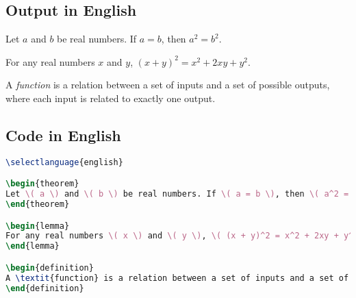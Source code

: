 \documentclass[swedish]{article}
\begin{document}
\subsection{Output in English}


\begin{theorem}
Let \( a \) and \( b \) be real numbers. If \( a = b \), then \( a^2 = b^2 \).
\end{theorem}

\begin{lemma}
For any real numbers \( x \) and \( y \), \( (x + y)^2 = x^2 + 2xy + y^2 \).
\end{lemma}

\begin{definition}
A \textit{function} is a relation between a set of inputs and a set of possible outputs, where each input is related to exactly one output.
\end{definition}

\subsection{Code in English}

\begin{lstlisting}[language=TeX]
\selectlanguage{english}

\begin{theorem}
Let \( a \) and \( b \) be real numbers. If \( a = b \), then \( a^2 = b^2 \).
\end{theorem}

\begin{lemma}
For any real numbers \( x \) and \( y \), \( (x + y)^2 = x^2 + 2xy + y^2 \).
\end{lemma}

\begin{definition}
A \textit{function} is a relation between a set of inputs and a set of possible outputs, where each input is related to exactly one output.
\end{definition}
\end{lstlisting}
\end{document}
